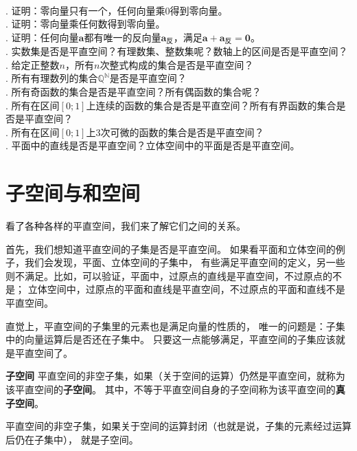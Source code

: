 \documentclass[12pt,UTF8]{ctexbook}
\begin{document}
\begin{xt}
    \mbox{} \\
    . 证明：零向量只有一个，任何向量乘$0$得到零向量。\\
    . 证明：零向量乘任何数得到零向量。\\
    . 证明：任何向量$\mathbf{a}$都有唯一的反向量$\mathbf{a}_{\text{反}}$，满足$\mathbf{a} + \mathbf{a}_{\text{反}} = \mathbf{0}$。\\
    . 实数集是否是平直空间？有理数集、整数集呢？数轴上的区间是否是平直空间？\\
    . 给定正整数$n$，所有$n$次整式构成的集合是否是平直空间？\\
    . 所有有理数列的集合$\mathbb{Q}^\mathbb{N}$是否是平直空间？\\
    . 所有奇函数的集合是否是平直空间？所有偶函数的集合呢？\\
    . 所有在区间$[0;1]$上连续的函数的集合是否是平直空间？所有有界函数的集合是否是平直空间？\\
    . 所有在区间$[0;1]$上$3$次可微的函数的集合是否是平直空间？\\
    . 平面中的直线是否是平直空间？立体空间中的平面是否是平直空间。
\end{xt}

\section{子空间与和空间}
看了各种各样的平直空间，我们来了解它们之间的关系。

首先，我们想知道平直空间的子集是否是平直空间。
如果看平面和立体空间的例子，我们会发现，平面、立体空间的子集中，
有些满足平直空间的定义，另一些则不满足。比如，可以验证，平面中，过原点的直线是平直空间，不过原点的不是；
立体空间中，过原点的平面和直线是平直空间，不过原点的平面和直线不是平直空间。

直觉上，平直空间的子集里的元素也是满足向量的性质的，
唯一的问题是：子集中的向量运算后是否还在子集中。
只要这一点能够满足，平直空间的子集应该就是平直空间了。

\begin{df}{\textbf{子空间}}
    平直空间的非空子集，如果（关于空间的运算）仍然是平直空间，就称为该平直空间的\textbf{子空间}。
    其中，不等于平直空间自身的子空间称为该平直空间的\textbf{真子空间}。
\end{df}

\begin{tm}
    平直空间的非空子集，如果关于空间的运算封闭（也就是说，子集的元素经过运算后仍在子集中），
    就是子空间。
\end{tm}
\end{document}
